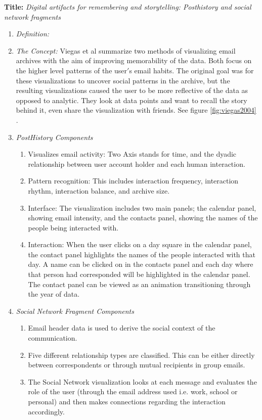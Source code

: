 \documentclass{egpubl}
\begin{document}
\textbf{Title:} \textit{Digital artifacts for remembering and storytelling: Posthistory and social network fragments}
\begin{enumerate}
\item \textit{Definition:} 
\item \textit{The Concept:} Viegas et al summarize two methods of visualizing email archives with the aim of improving memorability of the data. Both focus on the higher level patterns of the user$'$s email habits. The original goal was for these visualizations to uncover social patterns in the archive, but the resulting visualizations caused the user to be more reflective of the data as opposed to analytic. They look at data points and want to recall the story behind it, even share the visualization with friends. See figure \ref{fig:viegas2004} \cite{viegas2004}.
\item \textit{PostHistory Components}
\begin{enumerate}
\item Visualizes email activity: Two Axis stands for time, and the dyadic relationship between user account holder and each human interaction.
\item Pattern recognition: This includes interaction frequency, interaction rhythm, interaction balance, and archive size.
\item Interface: The visualization includes two main panels; the calendar panel, showing email intensity, and the contacts panel, showing the names of the people being interacted with. 
\item Interaction: When the user clicks on a day square in the calendar panel, the contact panel highlights the names of the people interacted with that day. A name can be clicked on in the contacts panel and each day where that person had corresponded will be highlighted in the calendar panel. The contact panel can be viewed as an animation transitioning through the year of data.
\end{enumerate}
\item \textit{Social Network Fragment Components}
\begin{enumerate}
\item Email header data is used to derive the social context of the communication.
\item Five different relationship types are classified. This can be either directly between correspondents or through mutual recipients in group emails.
\item The Social Network visualization looks at each message and evaluates the role of the user (through the email address used i.e. work, school or personal) and then makes connections regarding the interaction accordingly. 

\end{enumerate}
\end{enumerate}
\end{document}
